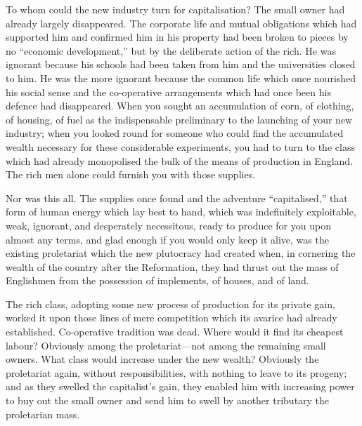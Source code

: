 \documentclass{book}
\begin{document}
To whom could the new industry turn for capitalisation? The small owner had already largely disappeared. The corporate life and mutual obligations which had supported him and confirmed him in his property had been broken to pieces by no “economic development,” but by the deliberate action of the rich. He was ignorant because his schools had been taken from him and the universities closed to him. He was the more ignorant because the common life which once nourished his social sense and the co-operative arrangements which had once been his defence had disappeared. When you sought an accumulation of corn, of clothing, of housing, of fuel as the indispensable preliminary to the launching of your new industry; when you looked round for someone who could find the accumulated wealth necessary for these considerable experiments, you had to turn to the class which had already monopolised the bulk of the means of production in England. The rich men alone could furnish you with those supplies.

Nor was this all. The supplies once found and the adventure “capitalised,” that form of human energy which lay best to hand, which was indefinitely exploitable, weak, ignorant, and desperately necessitous, ready to produce for you upon almost any terms, and glad enough if you would only keep it alive, was the existing proletariat which the new plutocracy had created when, in cornering the wealth of the country after the Reformation, they had thrust out the mass of Englishmen from the possession of implements, of houses, and of land.

The rich class, adopting some new process of production for its private gain, worked it upon those lines of mere competition which its avarice had already established. Co-operative tradition was dead. Where would it find its cheapest labour? Obviously among the proletariat—not among the remaining small owners. What class would increase under the new wealth? Obviously the proletariat again, without responsibilities, with nothing to leave to its progeny; and as they swelled the capitalist’s gain, they enabled him with increasing power to buy out the small owner and send him to swell by another tributary the proletarian mass.
\end{document}
